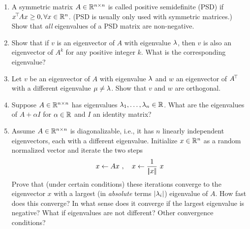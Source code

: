 

\renewcommand{\course}{Maths for Intelligent Systems}
\renewcommand{\coursedate}{Summer 2019}

\renewcommand{\exnum}{Exercise 3}

\exercises


\exercisestitle



\begin{enumerate}

\item A symmetric matrix $A\in{\mathbb{R}}^{n\times n}$ is called positive semidefinite (PSD) if $x^{\!\top\!} A x \geq 0, \forall x\in{\mathbb{R}}^n$. (PSD is usually only used with symmetric matrices.) Show that \emph{all} eigenvalues of a PSD matrix
  are non-negative.  


\item Show that if $v$ is an eigenvector of $A$ with eigenvalue $\lambda$, then
  $v$ is also an eigenvector of $A^k$ for any positive integer $k$. What is the
  corresponding eigenvalue?


\item Let $v$ be an eigenvector of $A$ with eigenvalue $\lambda$ and $w$ an
  eigenvector of $A^{\!\top\!}$ with a different eigenvalue $\mu\neq\lambda$. Show that
  $v$ and $w$ are orthogonal.


\item Suppose $A\in{\mathbb{R}}^{n\times n}$ has eigenvalues
  $\lambda_1,\ldots,\lambda_n\in{\mathbb{R}}$. What are the eigenvalues of $A + \alpha
  I$ for $\alpha\in{\mathbb{R}}$ and $I$ an identity matrix?


\item Assume $A\in {\mathbb{R}}^{n\times n}$ is diagonalizable, i.e., it has $n$
  linearly independent eigenvectors, each with a different eigenvalue. Initialize $x\in{\mathbb{R}}^n$ as a random
  normalized vector and iterate the two steps
$$
    x \gets A x~,\quad x \gets \frac{1}{|\!|x|\!|}~ x
$$
  Prove that (under certain conditions) these iterations converge to the eigenvector $x$ with a largest (in \emph{absolute} terms $|\lambda_i|$)
  eigenvalue of $A$. How fast does this converge? In what sense does it converge if the largest eigenvalue is negative? What if eigenvalues are not different? Other convergence conditions?



\end{enumerate}
